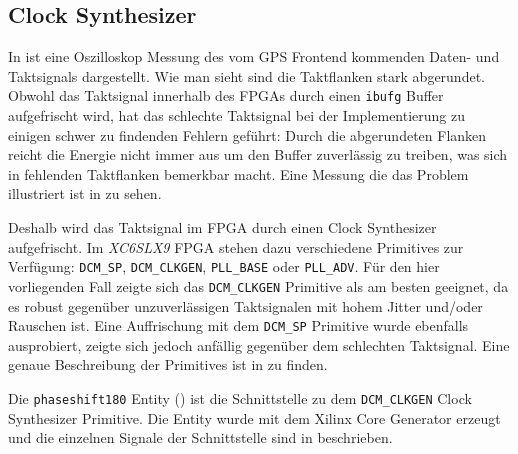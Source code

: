 \subsection{Clock Synthesizer}
In  ist eine Oszilloskop Messung des vom GPS Frontend kommenden Daten- und Taktsignals dargestellt. Wie man sieht sind die Taktflanken stark abgerundet. Obwohl das Taktsignal innerhalb des FPGAs durch einen \lstinline$ibufg$ Buffer aufgefrischt wird, hat das schlechte Taktsignal bei der Implementierung zu einigen schwer zu findenden Fehlern geführt: Durch die abgerundeten Flanken reicht die Energie nicht immer aus um den Buffer zuverlässig zu treiben, was sich in fehlenden Taktflanken bemerkbar macht. Eine Messung die das Problem illustriert ist in  zu sehen.

Deshalb wird das Taktsignal im FPGA durch einen Clock Synthesizer aufgefrischt. Im \emph{XC6SLX9} FPGA stehen dazu verschiedene \glspl{Primitive} zur Verfügung: \lstinline$DCM_SP$, \lstinline$DCM_CLKGEN$, \lstinline$PLL_BASE$ oder \lstinline$PLL_ADV$. Für den hier vorliegenden Fall zeigte sich das \lstinline$DCM_CLKGEN$ \gls{Primitive} als am besten geeignet, da es robust gegenüber unzuverlässigen Taktsignalen mit hohem Jitter und/oder Rauschen ist. Eine Auffrischung mit dem \lstinline$DCM_SP$ \gls{Primitive} wurde ebenfalls ausprobiert, zeigte sich jedoch anfällig gegenüber dem schlechten Taktsignal. Eine genaue Beschreibung der \glspl{Primitive} ist in \cite{SP6Clock} zu finden.



Die \lstinline$phaseshift180$ Entity () ist die Schnittstelle zu dem \lstinline$DCM_CLKGEN$  Clock Synthesizer \gls{Primitive}. Die Entity wurde mit dem Xilinx Core Generator erzeugt und die einzelnen Signale der Schnittstelle sind in  beschrieben.

